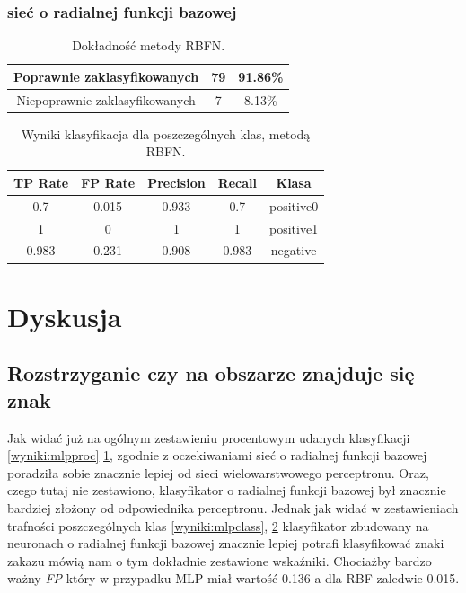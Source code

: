 \documentclass{classrep}
\begin{document}
\subsubsection{sieć o radialnej funkcji bazowej}


\begin{table}[H]
\centering
\begin{tabular}{|c|c|c|}
\hline 
Poprawnie zaklasyfikowanych & 79 & 91.86\% \\ 
\hline 
Niepoprawnie zaklasyfikowanych & 7 & 8.13\% \\
\hline 
\end{tabular} 
\caption{Dokładność metody RBFN.}
\label{wyniki:rbfproc}
\end{table}



\begin{table}[H]
\centering
\begin{tabular}{|c|c|c|c|c|}
\hline 
TP Rate &  FP Rate &  Precision &  Recall &  Klasa\\
\hline
0.7    &   0.015  &    0.933  &   0.7 &    positive0\\
\hline
1      &   0     &     1   &      1   &    positive1\\
\hline
0.983  &   0.231   &   0.908  &   0.983  & negative\\
\hline 
\end{tabular} 

\caption{Wyniki klasyfikacja dla poszczególnych klas, metodą RBFN.}
\label{wyniki:rbfclass}
\end{table}


\section{Dyskusja}


\subsection{Rozstrzyganie czy na obszarze znajduje się znak}
Jak widać już na ogólnym zestawieniu procentowym udanych klasyfikacji \ref{wyniki:mlpproc} \ref{wyniki:rbfproc}, zgodnie z oczekiwaniami sieć o radialnej funkcji bazowej poradziła sobie znacznie lepiej od sieci wielowarstwowego perceptronu. Oraz, czego tutaj nie zestawiono, klasyfikator o radialnej funkcji bazowej był znacznie bardziej złożony od odpowiednika perceptronu. Jednak jak widać w zestawieniach trafności poszczególnych klas \ref{wyniki:mlpclass}, \ref{wyniki:rbfclass} klasyfikator zbudowany na neuronach o radialnej funkcji bazowej znacznie lepiej potrafi klasyfikować znaki zakazu mówią nam o tym dokładnie zestawione wskaźniki. Chociażby bardzo ważny \emph{FP} który w przypadku MLP miał wartość 0.136 a dla RBF zaledwie 0.015.
\end{document}
